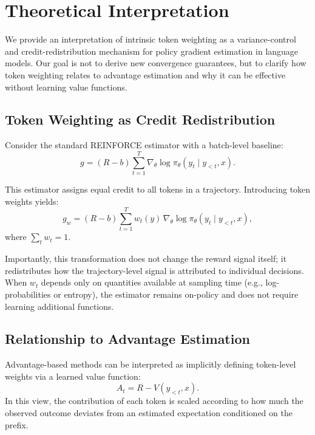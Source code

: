 \section{Theoretical Interpretation}\label{sec:theoretical}

We provide an interpretation of intrinsic token weighting as a variance-control and
credit-redistribution mechanism for policy gradient estimation in language models. Our
goal is not to derive new convergence guarantees, but to clarify how token weighting
relates to advantage estimation and why it can be effective without learning value
functions.

\subsection{Token Weighting as Credit Redistribution}

Consider the standard REINFORCE estimator with a batch-level baseline:
\begin{equation}
g = (R - b)\sum_{t=1}^{T} \nabla_\theta \log \pi_\theta(y_t \mid y_{<t}, x).
\end{equation}

This estimator assigns equal credit to all tokens in a trajectory. Introducing token
weights yields:
\begin{equation}
g_w = (R - b)\sum_{t=1}^{T} w_t(y)\, \nabla_\theta \log \pi_\theta(y_t \mid y_{<t}, x),
\end{equation}
where $\sum_t w_t = 1$.

Importantly, this transformation does not change the reward signal itself; it
redistributes how the trajectory-level signal is attributed to individual decisions.
When $w_t$ depends only on quantities available at sampling time (e.g.,
log-probabilities or entropy), the estimator remains on-policy and does not require
learning additional functions.

\subsection{Relationship to Advantage Estimation}

Advantage-based methods can be interpreted as implicitly defining token-level weights
via a learned value function:
\begin{equation}
A_t = R - V(y_{<t}, x).
\end{equation}
In this view, the contribution of each token is scaled according to how much the
observed outcome deviates from an estimated expectation conditioned on the prefix.

